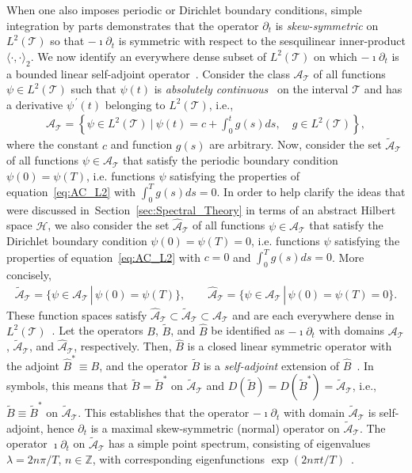 \documentclass[leqno,onefignum,onetabnum]{siamltex1213}
\newcommand{\secref}[1]{Section~\ref{#1}}
\newcommand{\Tc}{\mathcal{T}}
\newcommand{\Hs}{\mathscr{H}}
\newcommand{\As}{\mathscr{A}}
\begin{document}
When one also imposes periodic or Dirichlet boundary conditions,
simple integration by parts demonstrates that the operator $\partial_t$ is
\emph{skew-symmetric} on $L^2(\Tc)$ so that $-\imath\partial_t$ is symmetric with
respect to the sesquilinear inner-product $\langle\cdot,\cdot\rangle_2$. We now identify an
everywhere dense subset of $L^2(\Tc)$ on which $-\imath\partial_t$ is a bounded
linear self-adjoint operator~\cite{Reed-1980,Stone:64}. Consider the
class $\As_{\Tc}$ of all functions $\psi\in L^2(\Tc)$ such that $\psi(t)$ is
\emph{absolutely continuous}~\cite{Royden:1988:RA} on the interval
$\Tc$ and has a derivative $\psi^{\,\prime}(t)$ belonging to $L^2(\Tc)$,
i.e.,~\cite{Stone:64,Royden:1988:RA}     
%
\begin{align}\label{eq:AC_L2}
  \As_{\Tc}=
     \left\{
       \psi\in L^2(\Tc) \ \Big| \ \psi(t)=c+\int_0^tg(s)ds,
       \quad  g\in L^2(\Tc)
     \right\},
\end{align}
%
where the constant $c$ and function $g(s)$ are
arbitrary. Now, consider the set $\tilde{\As}_{\Tc}$ of all
functions $\psi\in\As_{\Tc}$ that satisfy the periodic boundary condition
$\psi(0)=\psi(T)$, i.e. functions $\psi$ satisfying the properties of 
equation~\eqref{eq:AC_L2} with $\int_0^Tg(s)ds=0$. In order to help
clarify the ideas that were discussed in~\secref{sec:Spectral_Theory}
in terms of an abstract 
Hilbert space $\Hs$, we also consider the set $\hat{\As}_{\Tc}$ of all
functions $\psi\in\As_{\Tc}$ that satisfy the Dirichlet boundary condition
$\psi(0)=\psi(T)=0$, i.e. functions $\psi$ satisfying the properties of
equation~\eqref{eq:AC_L2} with $c=0$ and $\int_0^Tg(s)ds=0$. More
concisely,  
%
\begin{align}\label{eq:AC_BC}
  \tilde{\As}_{\Tc}=\{\psi\in\As_{\Tc} \,|\, \psi(0)=\psi(T)\}, \qquad
  \hat{\As}_{\Tc}=\{\psi\in\As_{\Tc} \,|\, \psi(0)=\psi(T)=0\}.
\end{align}
%
These function spaces satisfy
$\hat{\As}_{\Tc}\subset\tilde{\As}_{\Tc}\subset\As_{\Tc}$ and are each everywhere
dense in $L^2(\Tc)$~\cite{Stone:64}. Let the operators $B$,
$\tilde{B}$, and $\hat{B}$ be identified as $-\imath\partial_t$ with domains
$\As_{\Tc}$, $\tilde{\As}_{\Tc}$, and $\hat{\As}_{\Tc}$,
respectively. Then, $\hat{B}$ is a closed linear symmetric operator
with the adjoint $\hat{B}^*\equiv B$, and the operator $\tilde{B}$ is a
\emph{self-adjoint} extension of $\hat{B}$~\cite{Stone:64}. In
symbols, this means that $\tilde{B}=\tilde{B}^*$ on
$\tilde{\As}_{\Tc}$ and
$D(\tilde{B})=D(\tilde{B}^*)=\tilde{\As}_{\Tc}$,
i.e., $\tilde{B}\equiv\tilde{B}^*$ on $\tilde{\As}_{\Tc}$. This establishes
that the operator $-\imath\partial_t$ with domain $\tilde{\As}_{\Tc}$ is
self-adjoint, hence $\partial_t$ is a maximal skew-symmetric (normal)
operator on $\tilde{\As}_{\Tc}$. The operator $\imath\partial_t$ on
$\tilde{\As}_{\Tc}$ has a simple point spectrum, consisting of
eigenvalues $\lambda=2n\pi/T$, $n\in\mathbb{Z}$, with corresponding
eigenfunctions $\exp(2n\pi t/T)$~\cite{Stone:64}.
\end{document}
